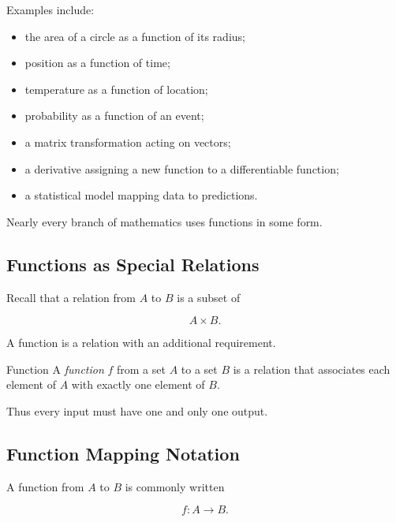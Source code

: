 Examples include:

\begin{itemize}
    \item the area of a circle as a function of its radius;
    \item position as a function of time;
    \item temperature as a function of location;
    \item probability as a function of an event;
    \item a matrix transformation acting on vectors;
    \item a derivative assigning a new function to a differentiable function;
    \item a statistical model mapping data to predictions.
\end{itemize}

Nearly every branch of mathematics uses functions in some form.

\subsection{Functions as Special Relations}
\label{subsec:functions-special-relations}

Recall that a relation from \(A\) to \(B\) is a subset of

\[ A\times B. \]

A function is a relation with an additional requirement.

\begin{definitionbox}{Function}
A \emph{function} \(f\) from a set \(A\) to a set \(B\) is a relation that
associates each element of \(A\) with exactly one element of \(B\).
\end{definitionbox}

Thus every input must have one and only one output.

\subsection{Function Mapping Notation}
\label{subsec:function-mapping-notation}

A function from \(A\) to \(B\) is commonly written

\[ f:A\to B. \]

